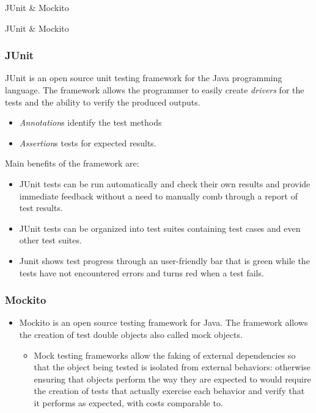 \documentclass{beamer}
\theoremstyle{definition}
\begin{document}
\begin{section}{JUnit \& Mockito}
	\begin{subsection}{JUnit \& Mockito}
		
		\begin{frame}
			
			\frametitle{JUnit}
			{\small 
				JUnit is an open source unit testing framework for the Java programming language.
				The framework allows the programmer to easily create \textit{drivers} for the tests and the ability to verify the produced outputs. 
				\begin{itemize}
					
					\item \textit{Annotation}s identify the test methods 
					\item \textit{Assertion}s tests for expected results.
					
				\end{itemize}
				Main benefits of the framework are: \begin{itemize}
					\item JUnit tests can be run automatically and check their own results and provide immediate feedback without a need to manually comb through a report of test results.
					
					\item JUnit tests can be organized into test suites containing test cases and even other test suites.
					
					\item Junit shows test progress through an user-friendly bar that is green while the tests have not encountered errors and turns red when a test fails.
					
				\end{itemize}}
			\end{frame}
			\begin{frame}
				\frametitle{Mockito}
				\begin{itemize}
			\item Mockito is an open source testing framework for Java. The framework allows the creation of test double objects also called mock objects.
					
		\begin{itemize}
				\item Mock testing frameworks allow the faking of external dependencies so that the object being tested is isolated from external behaviors: otherwise ensuring that objects perform the way they are expected to would require the creation of tests that actually exercise each behavior and verify that it performs as expected, with costs comparable to.
		\end{itemize}
				\end{itemize}
				\end{frame}
				

\end{subsection}
\end{section}
\end{document}
